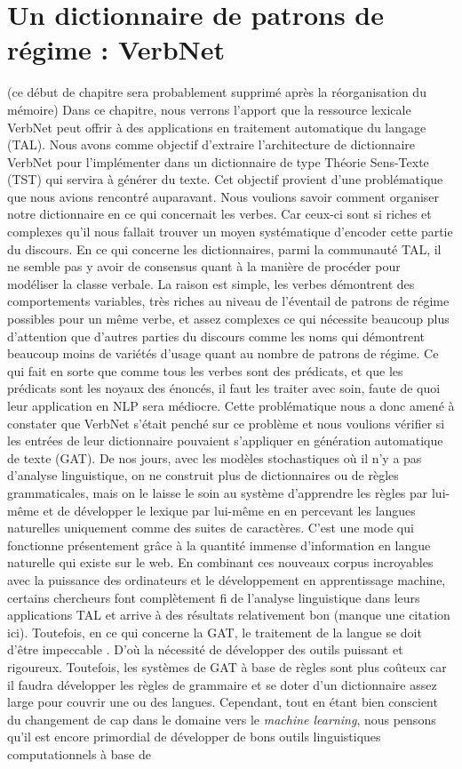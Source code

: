 
\chapter{Un dictionnaire de patrons de régime : VerbNet}

(ce début de chapitre sera probablement supprimé après la réorganisation du mémoire)
Dans ce chapitre, nous verrons l'apport que la ressource lexicale VerbNet peut offrir à des applications en traitement automatique du langage (TAL). Nous avons comme objectif d'extraire l'architecture de dictionnaire VerbNet pour l'implémenter dans un dictionnaire de type Théorie Sens-Texte (TST) qui servira à générer du texte. Cet objectif provient d'une problématique que nous avions rencontré auparavant. Nous voulions savoir comment organiser notre dictionnaire en ce qui concernait les verbes. Car ceux-ci sont si riches et complexes qu'il nous fallait trouver un moyen systématique d'encoder cette partie du discours. En ce qui concerne les dictionnaires, parmi la communauté TAL,  il ne semble pas y avoir de consensus quant à la manière de procéder pour modéliser la classe verbale. La raison est simple,  les verbes démontrent des comportements variables, très riches au niveau de l'éventail de patrons de régime possibles pour un même verbe, et assez complexes ce qui nécessite beaucoup plus d'attention que d'autres parties du discours comme les noms qui démontrent beaucoup moins de variétés d'usage quant au nombre de patrons de régime. Ce qui fait en sorte que comme tous les verbes sont des prédicats, et que les prédicats sont les noyaux des énoncés, il faut les traiter avec soin, faute de quoi leur application en NLP sera médiocre. Cette problématique nous a donc amené à constater que VerbNet s'était penché sur ce problème et nous voulions vérifier si les entrées de leur dictionnaire pouvaient s'appliquer en génération automatique de texte (GAT). De nos jours, avec les modèles stochastiques où il n'y a pas d'analyse linguistique, on ne construit plus de dictionnaires ou de règles grammaticales, mais on le laisse le soin au système d'apprendre les règles par lui-même et de développer le lexique par lui-même en en percevant les langues naturelles uniquement comme des suites de caractères. C'est une mode qui fonctionne présentement grâce à la quantité immense d'information en langue naturelle qui existe sur le web. En combinant ces nouveaux corpus incroyables avec la puissance des ordinateurs et le développement en apprentissage machine, certains chercheurs font complètement fi de l'analyse linguistique dans leurs applications TAL et arrive à des résultats relativement bon (manque une citation ici). Toutefois, en ce qui concerne la GAT, le traitement de la langue se doit d'être impeccable \citep{lareau18}. D'où la nécessité de développer des outils puissant et rigoureux. Toutefois, les systèmes de GAT à base de règles sont plus coûteux car il faudra développer les règles de grammaire et se doter d'un dictionnaire assez large pour couvrir une ou des langues. Cependant, tout en étant bien conscient du changement de cap dans le domaine vers le \emph{machine learning}, nous pensons qu'il est encore primordial de développer de bons outils linguistiques computationnels à base de 
